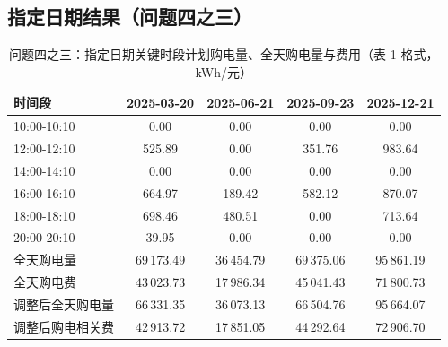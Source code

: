 \documentclass[12pt,a4paper,fontset=fandol]{ctexart}
\begin{document}
\subsection{指定日期结果（问题四之三\nobreak）}

\begin{table}[htbp]
\centering
\caption{问题四之三\nobreak：指定日期关键时段计划购电量\nobreak、全天购电量与费用（表 1 格式\nobreak，kWh/元\nobreak）}
\label{tab:q4t1}
\begin{tabular}{@{}lcccc@{}}
\toprule
时间段 & 2025-03-20 & 2025-06-21 & 2025-09-23 & 2025-12-21 \\
\midrule
10:00-10:10 & 0.00 & 0.00 & 0.00 & 0.00 \\
12:00-12:10 & 525.89 & 0.00 & 351.76 & 983.64 \\
14:00-14:10 & 0.00 & 0.00 & 0.00 & 0.00 \\
16:00-16:10 & 664.97 & 189.42 & 582.12 & 870.07 \\
18:00-18:10 & 698.46 & 480.51 & 0.00 & 713.64 \\
20:00-20:10 & 39.95 & 0.00 & 0.00 & 0.00 \\
\midrule
全天购电量 & 69\,173.49 & 36\,454.79 & 69\,375.06 & 95\,861.19 \\
全天购电费 & 43\,023.73 & 17\,986.34 & 45\,041.43 & 71\,800.73 \\
调整后全天购电量 & 66\,331.35 & 36\,073.13 & 66\,504.76 & 95\,664.07 \\
调整后购电相关费 & 42\,913.72 & 17\,851.05 & 44\,292.64 & 72\,906.70 \\
\bottomrule
\end{tabular}
\end{table}
\end{document}
